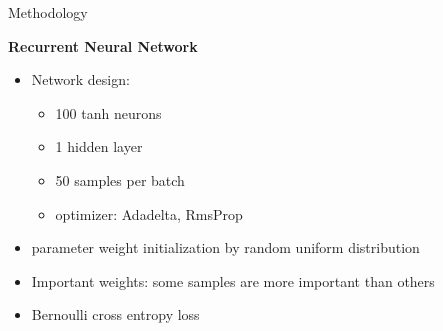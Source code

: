 \documentclass{beamer}
\begin{document}
\begin{frame}{Methodology}
{                \textbf{Recurrent Neural Network}
                \begin{itemize}
                    \item Network design:
                    \begin{itemize}
                        \item 100 tanh neurons
                        \item 1 hidden layer
                        \item 50 samples per batch
                        \item optimizer: Adadelta, RmsProp
                    \end{itemize}
                    \item parameter weight initialization by random uniform distribution
                    \item Important weights: some samples are more important than others
                    \item Bernoulli cross entropy loss
                \end{itemize}
        }
\end{frame}
\end{document}
